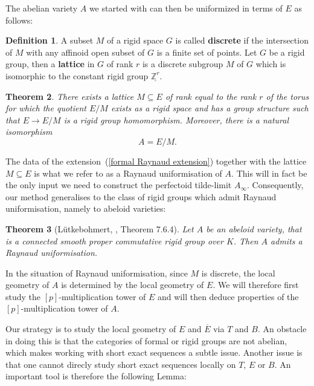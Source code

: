 \documentclass[10pt,oneside]{amsart}
\newtheorem{theorem}{Theorem}[section]
\theoremstyle{definition}
\newtheorem{definition}[theorem]{Definition}
\begin{document}
	The abelian variety $A$ we started with can then be uniformized in terms of $E$ as follows:
	
	\begin{definition}
		A subset $M$ of a rigid space $G$ is called \textbf{discrete} if the intersection of $M$ with any affinoid open subset of $G$ is a finite set of points.
		Let $G$ be a rigid group, then a \textbf{lattice} in $G$ of rank $r$ is a discrete subgroup $M$ of $G$ which is isomorphic to the constant rigid group $\underline{\mathbb Z^r}$. 
	\end{definition}
	
	\begin{theorem}\label{Raynaud uniformisation}
		There exists a lattice $M \subseteq E$ of rank equal to the rank $r$ of the torus for which the quotient $E/M$ exists as a rigid space and has a group structure such that $E\rightarrow E/M$ is a rigid group homomorphism. Moreover, there is a natural isomorphism
		\[A=E/M.\]
	\end{theorem}
	
	The data of the extension~(\ref{formal Raynaud extension}) together with the lattice $M\subseteq E$ is what we refer to as a Raynaud uniformisation of $A$. This will in fact be the only input we need to construct the perfectoid tilde-limit $A_\infty$. Consequently, our method generalises to the class of rigid groups which admit Raynaud uniformisation, namely to abeloid varieties:
	\begin{theorem}[L\"utkebohmert, \cite{rigid geometry of curves}, Theorem 7.6.4]\label{Raynaud uniformisation for abeloids}
		Let $A$ be an abeloid variety, that is a connected smooth proper commutative rigid group over $K$. Then $A$ admits a Raynaud uniformisation.
	\end{theorem}
	
	In the situation of Raynaud uniformisation, since $M$ is discrete, the local geometry of $A$ is determined by the local geometry of $E$. We will therefore first study the $[p]$-multiplication tower of $E$ and will then deduce properties of the $[p]$-multiplication tower of $A$.

	 Our strategy is to study the local geometry of $E$ and $\overline{E}$ via $T$ and $B$. An obstacle in doing this is that the categories of formal or rigid groups are not abelian, which makes working with short exact sequences a subtle issue. Another issue is that one cannot direcly study short exact sequences locally on $T$, $E$ or $B$. 
	An important tool is therefore the following Lemma:
\end{document}
